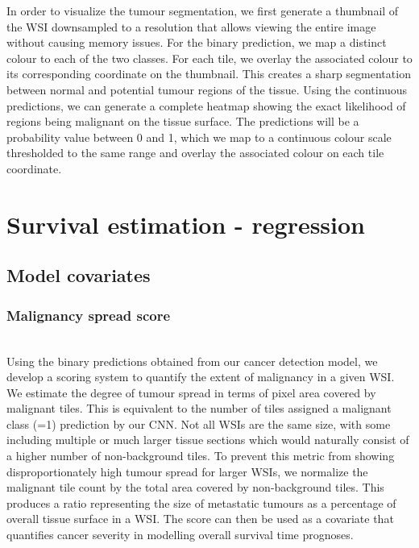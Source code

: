 \documentclass{l4proj}
\begin{document}
In order to visualize the tumour segmentation, we first generate a thumbnail of the WSI downsampled to a resolution that allows viewing the entire image without causing memory issues. For the binary prediction, we map a distinct colour to each of the two classes. For each tile, we overlay the associated colour to its corresponding coordinate on the thumbnail. This creates a sharp segmentation between normal and potential tumour regions of the tissue. Using the continuous predictions, we can generate a complete heatmap showing the exact likelihood of regions being malignant on the tissue surface. The predictions will be a probability value between 0 and 1, which we map to a continuous colour scale thresholded to the same range and overlay the associated colour on each tile coordinate. 

\section{Survival estimation - regression}
\subsection{Model covariates} \label{sec:covariates}
\subsubsection{Malignancy spread score} 
\hfill\\
Using the binary predictions obtained from our cancer detection model, we develop a scoring system to quantify the extent of malignancy in a given WSI. We estimate the degree of tumour spread in terms of pixel area covered by malignant tiles. This is equivalent to the number of tiles assigned a malignant 
class (=1) prediction by our CNN. Not all WSIs are the same size, with some including multiple or much larger tissue sections which would naturally consist of a higher number of non-background tiles. To prevent this metric from showing disproportionately high tumour spread for larger WSIs, we normalize the malignant tile count by the total area covered by non-background tiles. This produces a ratio representing the size of metastatic tumours as a percentage of overall tissue surface in a WSI. The score can then be used as a covariate that quantifies cancer severity in modelling overall survival time prognoses. 
\end{document}
